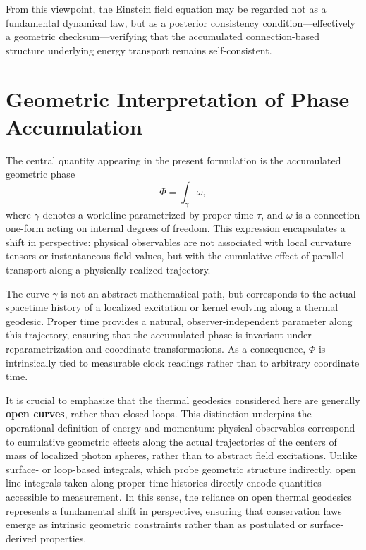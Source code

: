 \documentclass[%
 reprint,
 amsmath,amssymb,
 aps,
 prb,
]{revtex4-2}
\numberwithin{equation}{section}
\begin{document}
From this viewpoint, the Einstein field equation may be regarded not as a fundamental dynamical law, but as a posterior consistency condition---effectively a geometric checksum---verifying that the accumulated connection-based structure underlying energy transport remains self-consistent.


\section{Geometric Interpretation of Phase Accumulation}
\label{sec:phase_interpretation}

The central quantity appearing in the present formulation is the accumulated geometric phase
\begin{equation}
\Phi = \int_{\gamma} \omega ,
\end{equation}
where $\gamma$ denotes a worldline parametrized by proper time $\tau$, and $\omega$ is a connection one-form acting on internal degrees of freedom.
This expression encapsulates a shift in perspective: physical observables are not associated with local curvature tensors or instantaneous field values, but with the cumulative effect of parallel transport along a physically realized trajectory.

The curve $\gamma$ is not an abstract mathematical path, but corresponds to the actual spacetime history of a localized excitation or kernel evolving along a thermal geodesic.
Proper time provides a natural, observer-independent parameter along this trajectory, ensuring that the accumulated phase is invariant under reparametrization and coordinate transformations.
As a consequence, $\Phi$ is intrinsically tied to measurable clock readings rather than to arbitrary coordinate time.

It is crucial to emphasize that the thermal geodesics considered here are generally \textbf{open curves}, rather than closed loops.
This distinction underpins the operational definition of energy and momentum: physical observables correspond to cumulative geometric effects along the actual trajectories of the centers of mass of localized photon spheres, rather than to abstract field excitations.
Unlike surface- or loop-based integrals, which probe geometric structure indirectly, open line integrals taken along proper-time histories directly encode quantities accessible to measurement.
In this sense, the reliance on open thermal geodesics represents a fundamental shift in perspective, ensuring that conservation laws emerge as intrinsic geometric constraints rather than as postulated or surface-derived properties.
\end{document}
